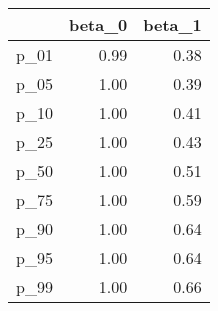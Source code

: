 \begin{table}[ht]
\centering
\begin{tabular}{rrr}
  \hline
 & beta\_0 & beta\_1 \\ 
  \hline
p\_01 & 0.99 & 0.38 \\ 
  p\_05 & 1.00 & 0.39 \\ 
  p\_10 & 1.00 & 0.41 \\ 
  p\_25 & 1.00 & 0.43 \\ 
  p\_50 & 1.00 & 0.51 \\ 
  p\_75 & 1.00 & 0.59 \\ 
  p\_90 & 1.00 & 0.64 \\ 
  p\_95 & 1.00 & 0.64 \\ 
  p\_99 & 1.00 & 0.66 \\ 
   \hline
\end{tabular}
\end{table}
